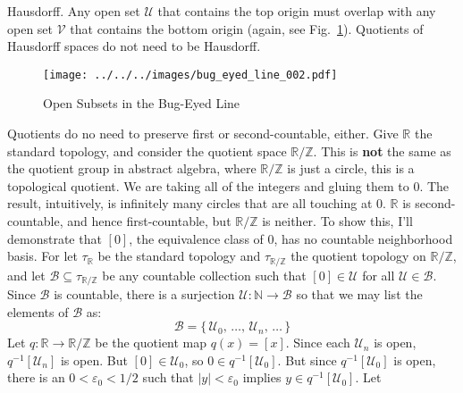 \documentclass{article}
\theoremstyle{plain}
\theoremstyle{normal}
\begin{document}
        Hausdorff. Any open set $\mathcal{U}$ that contains the top origin must
        overlap with any open set $\mathcal{V}$ that contains the bottom
        origin (again, see Fig.~\ref{fig:bug_eyed_line_002}). Quotients of
        Hausdorff spaces do not need to be Hausdorff.
        \begin{figure}
            \centering
            \texttt{[image: ../../../images/bug\_eyed\_line\_002.pdf]}
            \caption{Open Subsets in the Bug-Eyed Line}
            \label{fig:bug_eyed_line_002}
        \end{figure}
        \par\hfill\par
        Quotients do no need to preserve first or second-countable, either.
        Give $\mathbb{R}$ the standard topology, and consider the quotient space
        $\mathbb{R}/\mathbb{Z}$. This is \textbf{not} the same as the quotient
        group in abstract algebra, where $\mathbb{R}/\mathbb{Z}$ is just a
        circle, this is a topological quotient. We are taking all of the
        integers and gluing them to $0$. The result, intuitively, is infinitely
        many circles that are all touching at $0$. $\mathbb{R}$ is
        second-countable, and hence first-countable, but $\mathbb{R}/\mathbb{Z}$
        is neither. To show this, I'll demonstrate that $[0]$, the equivalence
        class of $0$, has no countable neighborhood basis. For let
        $\tau_{\mathbb{R}}$ be the standard topology and
        $\tau_{\mathbb{R}/\mathbb{Z}}$ the quotient topology on
        $\mathbb{R}/\mathbb{Z}$, and let
        $\mathcal{B}\subseteq\tau_{\mathbb{R}/\mathbb{Z}}$ be any countable
        collection such that $[0]\in\mathcal{U}$ for all
        $\mathcal{U}\in\mathcal{B}$. Since $\mathcal{B}$ is countable, there
        is a surjection $\mathcal{U}:\mathbb{N}\rightarrow\mathcal{B}$ so
        that we may list the elements of $\mathcal{B}$ as:
        \begin{equation}
            \mathcal{B}=
            \{\,\mathcal{U}_{0},\,\dots,\,\mathcal{U}_{n},\,\dots\,\}
        \end{equation}
        Let $q:\mathbb{R}\rightarrow\mathbb{R}/\mathbb{Z}$ be the quotient
        map $q(x)=[x]$. Since each $\mathcal{U}_{n}$ is open,
        $q^{-1}[\mathcal{U}_{n}]$ is open. But $[0]\in\mathcal{U}_{0}$, so
        $0\in{q}^{-1}[\mathcal{U}_{0}]$. But since $q^{-1}[\mathcal{U}_{0}]$ is
        open, there is an $0<\varepsilon_{0}<1/2$ such that
        $|y|<\varepsilon_{0}$ implies $y\in{q}^{-1}[\mathcal{U}_{0}]$. Let
\end{document}
